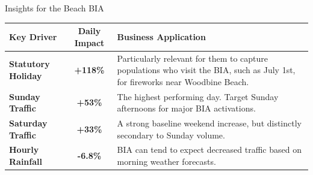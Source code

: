 \documentclass[10pt, aspectratio=169]{beamer}
\begin{document}
\begin{frame}{Insights for the Beach BIA}
    
    \vspace{0.2cm}
    
    \begin{table}
        \centering
        \renewcommand{\arraystretch}{1.8} %
        \begin{tabular}{@{} p{3.5cm} c p{6cm} @{}}
            \toprule
            \textbf{Key Driver} & \textbf{Daily Impact} & \textbf{Business Application} \\
            \midrule
            
            \textbf{Statutory Holiday} & 
            \textcolor{blue!80!black}{\textbf{+118\%}} & 
            \small Particularly relevant for them to capture populations who visit the BIA, such as July 1st, for fireworks near Woodbine Beach. \\
            
            \textbf{Sunday Traffic} & 
            \textcolor{blue!80!black}{\textbf{+53\%}} & 
            \small The highest performing day. Target Sunday afternoons for major BIA activations. \\
            
            \textbf{Saturday Traffic} & 
            \textcolor{blue!80!black}{\textbf{+33\%}} & 
            \small A strong baseline weekend increase, but distinctly secondary to Sunday volume. \\
            
            \textbf{Hourly Rainfall} & 
            \textcolor{red!80!black}{\textbf{-6.8\%}} & 
            \small BIA can tend to expect decreased traffic based on morning weather forecasts. \\
            
            \bottomrule
        \end{tabular}
    \end{table}
    
\end{frame}
\end{document}
